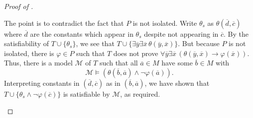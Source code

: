 \documentclass[../notes.tex]{subfiles}
\begin{document}
\begin{proof}[Proof of ]
\begin{enumerate}
		The point is to contradict the fact that $P$ is not isolated. Write $\theta_s$ as $\theta(\overline d,\overline c)$ where $\overline d$ are the constants which appear in $\theta_s$ despite not appearing in $\overline c$. By the satisfiability of $T\cup\{\theta_s\}$, we see that $T\cup\{\exists\overline y\exists\overline x\,\theta(\overline y,\overline x)\}$. But because $P$ is not isolated, there is $\varphi\in P$ such that $T$ does not prove $\forall\overline y\exists\overline x\,(\theta(\overline y,\overline x)\to\varphi(\overline x))$. Thus, there is a model $\mathcal M$ of $T$ such that all $\overline a\in M$ have some $\overline b\in M$ with
		\[\mathcal M\models(\theta(\overline b,\overline a)\land\lnot\varphi(\overline a)).\]
		Interpreting constants in $(\overline d,\overline c)$ as in $(\overline b,\overline a)$, we have shown that $T\cup\{\theta_s\land\lnot\varphi(\overline c)\}$ is satisfiable by $\mathcal M$, as required.
		\qedhere
	\end{enumerate}
\end{proof}
\end{document}
